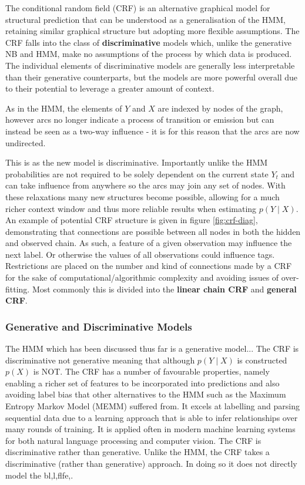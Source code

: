 \documentclass[../main.tex]{subfiles}
\begin{document}
The conditional random field (CRF) \autocite{lafferty-crf-2001} is an alternative graphical model for structural prediction that can be understood as a generalisation of the HMM, retaining similar graphical structure but adopting more flexible assumptions.
The CRF falls into the class of \textbf{discriminative} models which, unlike the generative NB and HMM, make no assumptions of the process by which data is produced.
The individual elements of discriminative models are generally less interpretable than their generative counterparts, but the models are more powerful overall due to their potential to leverage a greater amount of context.


As in the HMM, the elements of $Y$ and $X$ are indexed by nodes of the graph, however arcs no longer indicate a process of transition or emission but can instead be seen as a two-way influence - it is for this reason that the arcs are now undirected.


This is as the new model is discriminative.
Importantly unlike the HMM probabilities are not required to be solely dependent on the current state $Y_t$ and can take influence from anywhere so the arcs may join any set of nodes.
With these relaxations many new structures become possible, allowing for a much richer context window and thus more reliable results when estimating $p(Y \mid X)$.
An example of potential CRF structure is given in figure \ref{fig:crf-diag}, demonstrating that connections are possible between all nodes in both the hidden and observed chain.
As such, a feature of a given observation may influence the next label. Or otherwise the values of all observations could influence tags.
Restrictions are placed on the number and kind of connections made by a CRF for the sake of computational/algorithmic complexity and avoiding issues of over-fitting.
Most commonly this is divided into the \textbf{linear chain CRF} and \textbf{general CRF}.

%



\subsubsection{Generative and Discriminative Models}
The HMM which has been discussed thus far is a generative model...
The CRF is discriminative not generative meaning that although $p(Y \mid X)$ is constructed $p(X)$ is NOT.
The CRF has a number of favourable properties, namely enabling a richer set of features to be incorporated into predictions and also avoiding label bias that other alternatives to the HMM such as the Maximum Entropy Markov Model (MEMM) suffered from.
It excels at labelling and parsing sequential data due to a learning approach that is able to infer relationships over many rounds of training.
It is applied often in modern machine learning systems for both natural language processing and computer vision.
The CRF is discriminative rather than generative.
Unlike the HMM, the CRF takes a discriminative (rather than generative) approach. In doing so it does not directly model the bl,l,flfe,.
\end{document}
